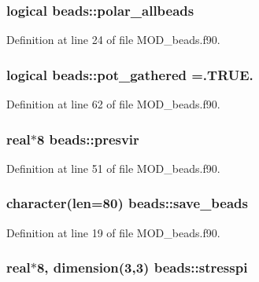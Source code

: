 \hypertarget{classbeads_adad817f105ba6e27f7f279166873ebf6}{
\subsubsection[{polar\-\_\-allbeads}]{\setlength{\rightskip}{0pt plus 5cm}logical beads\-::polar\-\_\-allbeads}}\label{classbeads_adad817f105ba6e27f7f279166873ebf6}


Definition at line 24 of file M\-O\-D\-\_\-beads.\-f90.

\hypertarget{classbeads_aab5d9071ceb4efc44ff75a705a3e0ec5}{
\subsubsection[{pot\-\_\-gathered}]{\setlength{\rightskip}{0pt plus 5cm}logical beads\-::pot\-\_\-gathered =.T\-R\-U\-E.}}\label{classbeads_aab5d9071ceb4efc44ff75a705a3e0ec5}


Definition at line 62 of file M\-O\-D\-\_\-beads.\-f90.

\hypertarget{classbeads_a8eadc4b834c6fa3a55d3e6d8f7338165}{
\subsubsection[{presvir}]{\setlength{\rightskip}{0pt plus 5cm}real$\ast$8 beads\-::presvir}}\label{classbeads_a8eadc4b834c6fa3a55d3e6d8f7338165}


Definition at line 51 of file M\-O\-D\-\_\-beads.\-f90.

\hypertarget{classbeads_a7f5dc8a98fd4571afd6cff2250578f83}{
\subsubsection[{save\-\_\-beads}]{\setlength{\rightskip}{0pt plus 5cm}character(len=80) beads\-::save\-\_\-beads}}\label{classbeads_a7f5dc8a98fd4571afd6cff2250578f83}


Definition at line 19 of file M\-O\-D\-\_\-beads.\-f90.

\hypertarget{classbeads_a03a9eebd00567c9725d71b8ad2b4d379}{
\subsubsection[{stresspi}]{\setlength{\rightskip}{0pt plus 5cm}real$\ast$8, dimension(3,3) beads\-::stresspi}}\label{classbeads_a03a9eebd00567c9725d71b8ad2b4d379}


